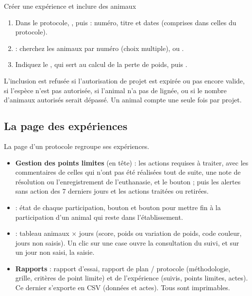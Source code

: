 \documentclass[11pt,a4paper]{article}
\begin{document}
\begin{procedure}{Créer une expérience et inclure des animaux}
\begin{enumerate}
  \item Dans le protocole, , puis  : numéro, titre et dates (comprises dans celles du
    protocole).
  \item {} : cherchez les animaux par numéro (choix
    multiple), ou .
  \item Indiquez le , qui sert au calcul de la
    perte de poids, puis .
\end{enumerate}
\end{procedure}
\begin{regle}
L'inclusion est refusée si l'autorisation de projet est expirée ou pas encore
valide, si l'espèce n'est pas autorisée, si l'animal n'a pas de lignée, ou si
le nombre d'animaux autorisés serait dépassé. Un animal compte une seule fois
par projet.
\end{regle}

\subsection{La page des expériences}
La page d'un protocole regroupe ses expériences.
\begin{itemize}
  \item \textbf{Gestion des points limites} (en tête) : les actions requises
    à traiter, avec les commentaires de celles qui n'ont pas été réalisées
    tout de suite, une note de résolution ou l'enregistrement de
    l'euthanasie, et le bouton  ; puis les
    alertes sans action des 7 derniers jours et les actions traitées ou
    retirées.
  \item {} : état de chaque participation, bouton
     et bouton  pour mettre fin à la
    participation d'un animal qui reste dans l'établissement.
  \item {} : tableau animaux × jours
    (score, poids ou variation de poids, code couleur, jours non saisis). Un
    clic sur une case ouvre la consultation du suivi, et sur un jour non
    saisi, la saisie.
  \item \textbf{Rapports} : rapport d'essai, rapport de plan / protocole
    (méthodologie, grille, critères de point limite) et  de l'expérience (suivis, points limites, actes). Ce dernier
    s'exporte en CSV (données et actes). Tous sont imprimables.
\end{itemize}
\end{document}

